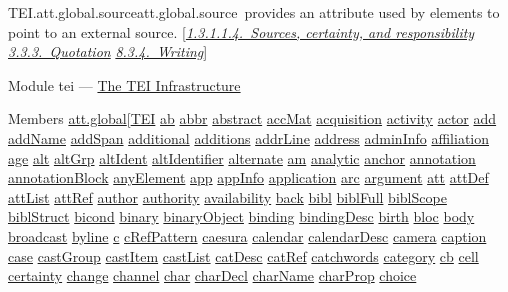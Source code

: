 \begin{reflist}
\item[]\begin{specHead}{TEI.att.global.source}{att.global.source} provides an attribute used by elements to point to an external source. [\textit{\hyperref[STGAso]{1.3.1.1.4.\ Sources, certainty, and responsibility}} \textit{\hyperref[COHQQ]{3.3.3.\ Quotation}} \textit{\hyperref[TSBAWR]{8.3.4.\ Writing}}]\end{specHead} 
    \item[{Module}]
  tei — \hyperref[ST]{The TEI Infrastructure}
    \item[{Members}]
  \hyperref[TEI.att.global]{att.global}[\hyperref[TEI.TEI]{TEI} \hyperref[TEI.ab]{ab} \hyperref[TEI.abbr]{abbr} \hyperref[TEI.abstract]{abstract} \hyperref[TEI.accMat]{accMat} \hyperref[TEI.acquisition]{acquisition} \hyperref[TEI.activity]{activity} \hyperref[TEI.actor]{actor} \hyperref[TEI.add]{add} \hyperref[TEI.addName]{addName} \hyperref[TEI.addSpan]{addSpan} \hyperref[TEI.additional]{additional} \hyperref[TEI.additions]{additions} \hyperref[TEI.addrLine]{addrLine} \hyperref[TEI.address]{address} \hyperref[TEI.adminInfo]{adminInfo} \hyperref[TEI.affiliation]{affiliation} \hyperref[TEI.age]{age} \hyperref[TEI.alt]{alt} \hyperref[TEI.altGrp]{altGrp} \hyperref[TEI.altIdent]{altIdent} \hyperref[TEI.altIdentifier]{altIdentifier} \hyperref[TEI.alternate]{alternate} \hyperref[TEI.am]{am} \hyperref[TEI.analytic]{analytic} \hyperref[TEI.anchor]{anchor} \hyperref[TEI.annotation]{annotation} \hyperref[TEI.annotationBlock]{annotationBlock} \hyperref[TEI.anyElement]{anyElement} \hyperref[TEI.app]{app} \hyperref[TEI.appInfo]{appInfo} \hyperref[TEI.application]{application} \hyperref[TEI.arc]{arc} \hyperref[TEI.argument]{argument} \hyperref[TEI.att]{att} \hyperref[TEI.attDef]{attDef} \hyperref[TEI.attList]{attList} \hyperref[TEI.attRef]{attRef} \hyperref[TEI.author]{author} \hyperref[TEI.authority]{authority} \hyperref[TEI.availability]{availability} \hyperref[TEI.back]{back} \hyperref[TEI.bibl]{bibl} \hyperref[TEI.biblFull]{biblFull} \hyperref[TEI.biblScope]{biblScope} \hyperref[TEI.biblStruct]{biblStruct} \hyperref[TEI.bicond]{bicond} \hyperref[TEI.binary]{binary} \hyperref[TEI.binaryObject]{binaryObject} \hyperref[TEI.binding]{binding} \hyperref[TEI.bindingDesc]{bindingDesc} \hyperref[TEI.birth]{birth} \hyperref[TEI.bloc]{bloc} \hyperref[TEI.body]{body} \hyperref[TEI.broadcast]{broadcast} \hyperref[TEI.byline]{byline} \hyperref[TEI.c]{c} \hyperref[TEI.cRefPattern]{cRefPattern} \hyperref[TEI.caesura]{caesura} \hyperref[TEI.calendar]{calendar} \hyperref[TEI.calendarDesc]{calendarDesc} \hyperref[TEI.camera]{camera} \hyperref[TEI.caption]{caption} \hyperref[TEI.case]{case} \hyperref[TEI.castGroup]{castGroup} \hyperref[TEI.castItem]{castItem} \hyperref[TEI.castList]{castList} \hyperref[TEI.catDesc]{catDesc} \hyperref[TEI.catRef]{catRef} \hyperref[TEI.catchwords]{catchwords} \hyperref[TEI.category]{category} \hyperref[TEI.cb]{cb} \hyperref[TEI.cell]{cell} \hyperref[TEI.certainty]{certainty} \hyperref[TEI.change]{change} \hyperref[TEI.channel]{channel} \hyperref[TEI.char]{char} \hyperref[TEI.charDecl]{charDecl} \hyperref[TEI.charName]{charName} \hyperref[TEI.charProp]{charProp} \hyperref[TEI.choice]{choice} 
\end{reflist}
